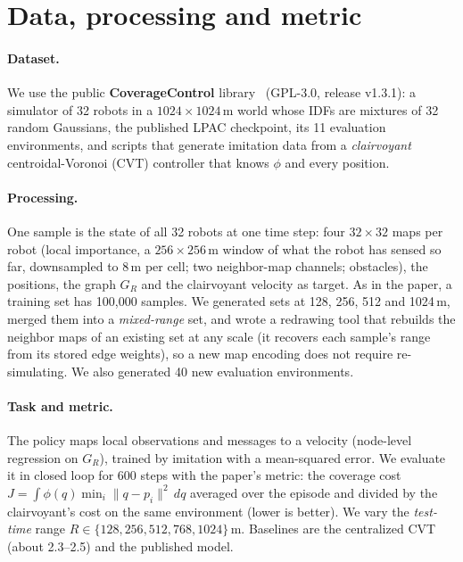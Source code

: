 \documentclass{article}
\begin{document}
\section{Data, processing and metric}
\paragraph{Dataset.} We use the public \textbf{CoverageControl} library~\citep{coveragecontrol} (GPL-3.0, release v1.3.1): a simulator of 32 robots in a $1024\times1024$\,m world whose IDFs are mixtures of 32 random Gaussians, the published LPAC checkpoint, its 11 evaluation environments, and scripts that generate imitation data from a \emph{clairvoyant} centroidal-Voronoi (CVT) controller that knows $\phi$ and every position.

\paragraph{Processing.} One sample is the state of all 32 robots at one time step: four $32\times32$ maps per robot (local importance, a $256\times256$\,m window of what the robot has sensed so far, downsampled to 8\,m per cell; two neighbor-map channels; obstacles), the positions, the graph $G_R$ and the clairvoyant velocity as target. As in the paper, a training set has 100{,}000 samples. We generated sets at 128, 256, 512 and 1024\,m, merged them into a \emph{mixed-range} set, and wrote a redrawing tool that rebuilds the neighbor maps of an existing set at any scale (it recovers each sample's range from its stored edge weights), so a new map encoding does not require re-simulating. We also generated 40 new evaluation environments.

\paragraph{Task and metric.} The policy maps local observations and messages to a velocity (node-level regression on $G_R$), trained by imitation with a mean-squared error. We evaluate it in closed loop for 600 steps with the paper's metric: the coverage cost $J=\int\phi(q)\min_i\|q-p_i\|^2\,dq$ averaged over the episode and divided by the clairvoyant's cost on the same environment (lower is better). We vary the \emph{test-time} range $R\in\{128,256,512,768,1024\}$\,m. Baselines are the centralized CVT (about 2.3--2.5) and the published model.
\end{document}
